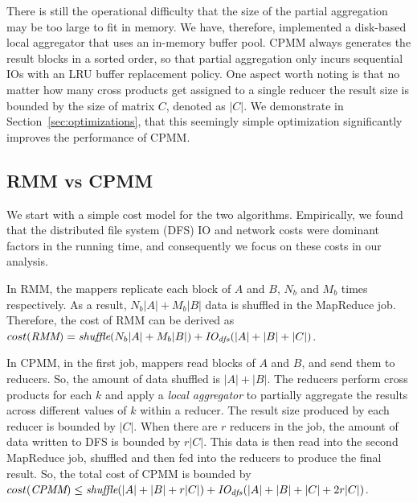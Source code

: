 {There is still the operational difficulty that
the size of the partial aggregation may be too large to fit in memory. We have,
therefore, implemented a disk-based local aggregator that uses an in-memory buffer pool. CPMM always generates the result blocks in a sorted order, so that partial aggregation only incurs sequential IOs with an LRU buffer replacement policy. One aspect worth noting is that no matter how many cross products get assigned to a single reducer the result size is bounded by the size of matrix $C$, denoted as $|C|$. We demonstrate in Section~\ref{sec:optimizations}, that this seemingly simple optimization significantly improves the performance of CPMM.

\subsection{RMM vs CPMM}\label{sec:mmult-cmp} 
We start with a simple cost model for the two algorithms. Empirically,
we found that the distributed file system (DFS) IO and network costs were dominant factors in the running time, and consequently we focus on these costs in our analysis.

In RMM, the mappers replicate each block of $A$ and $B$, $N_b$ 
and $M_b$ times respectively.
As a result, $N_b|A|+M_b|B|$ data is shuffled in the MapReduce
job. Therefore, the cost of RMM can be derived as $cost(\textit{RMM})=
\textit{shuffle}(N_b|A|+M_b|B|)+\textit{IO}_{\it dfs}(|A| + |B| + |C|)$.


In CPMM, in the first job, mappers read blocks of $A$ and
$B$, and send them to reducers. So, the amount of data shuffled is
$|A|+|B|$. The reducers perform cross products for each $k$ and apply
a \textit{local aggregator} to partially aggregate the results across
different values of $k$ within a reducer. The result size produced
by each reducer is bounded by $|C|$. When there are $r$ reducers in the
job, the amount of data written to DFS is bounded by $r|C|$.  This
data is then read into the second MapReduce job, shuffled and then
fed into the reducers to produce the final result. So, the total cost
of CPMM is bounded by $cost(\textit{CPMM})\leq
\textit{shuffle}(|A|+|B|+r|C|)+\textit{IO}_{\it dfs}(|A| + |B| + |C|+ 2r|C|)$.

}
